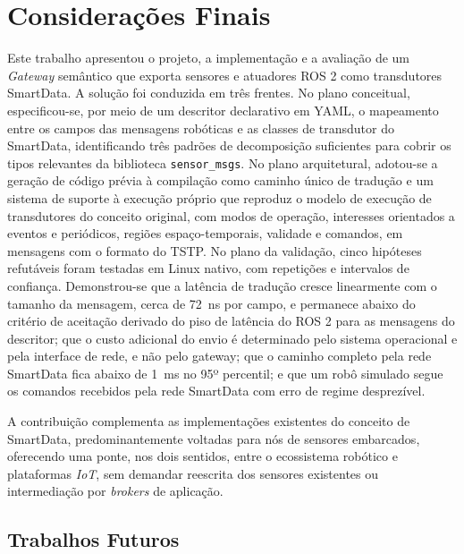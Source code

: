 \documentclass[
    12pt,
    oneside,
    a4paper,
    chapter=TITLE,
    section=TITLE,
    english,
    brazil
]{abntex2}
\begin{document}
\chapter{Considerações Finais}
\label{cap:conclusao}

Este trabalho apresentou o projeto, a implementação e a avaliação de
um \textit{Gateway} semântico que exporta sensores e atuadores ROS 2 como
transdutores SmartData. A solução foi conduzida em três frentes. No plano
conceitual, especificou-se, por meio de um descritor declarativo em YAML,
o mapeamento entre
os campos das mensagens robóticas e as classes de transdutor do
SmartData, identificando três padrões de decomposição suficientes para
cobrir os tipos relevantes da biblioteca \texttt{sensor\_msgs}. No plano
arquitetural, adotou-se a geração de código prévia à compilação como
caminho único de tradução e um sistema de suporte à execução próprio que
reproduz o modelo de execução de transdutores do conceito original, com modos de
operação, interesses orientados a eventos e periódicos, regiões
espaço-temporais, validade e comandos, em mensagens com o formato do
TSTP. No plano da validação, cinco hipóteses refutáveis foram testadas
em Linux nativo, com repetições e intervalos de confiança. Demonstrou-se
que a latência de tradução cresce linearmente com o tamanho da mensagem,
cerca de \SI{72}{\nano\second} por campo, e permanece abaixo do critério
de aceitação derivado do piso de latência do ROS 2
\cite{kronauer2021latency} para as mensagens do descritor; que o custo
adicional do envio é determinado pelo sistema operacional e pela
interface de rede, e não pelo gateway; que o caminho completo pela rede
SmartData fica abaixo de \SI{1}{\milli\second} no 95º percentil; e que um
robô simulado segue os comandos recebidos pela rede SmartData com erro de
regime desprezível.

A contribuição complementa as implementações existentes do conceito de
SmartData, predominantemente voltadas para nós de sensores embarcados,
oferecendo uma ponte, nos dois sentidos, entre o ecossistema robótico e
plataformas \textit{IoT}, sem demandar reescrita dos sensores existentes
ou intermediação por \textit{brokers} de aplicação.

\section{Trabalhos Futuros}
\label{sec:futuro}
\end{document}
